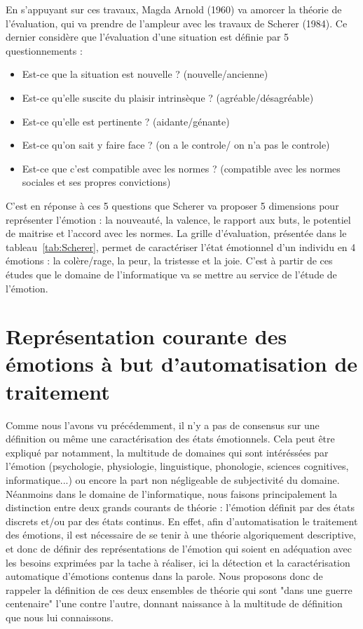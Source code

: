 En s'appuyant sur ces travaux, Magda Arnold (1960) va amorcer la théorie de l'évaluation, qui va prendre de l'ampleur avec les travaux de Scherer (1984). Ce dernier considère que l'évaluation d'une situation est définie par 5 questionnements :
\begin{itemize}
  \item Est-ce que la situation est nouvelle ? (nouvelle/ancienne)
  \item Est-ce qu'elle suscite du plaisir intrinsèque ? (agréable/désagréable)
  \item Est-ce qu'elle est pertinente ? (aidante/génante)
  \item Est-ce qu'on sait y faire face ? (on a le controle/ on n'a pas le controle)
  \item Est-ce que c'est compatible avec les normes ? (compatible avec les normes sociales et ses propres convictions)
\end{itemize}
C'est en réponse à ces 5 questions que Scherer va proposer 5 dimensions pour représenter l'émotion : la nouveauté, la valence, le rapport aux buts, le potentiel de maitrise et l'accord avec les normes. La grille d'évaluation, présentée dans le tableau~\ref{tab:Scherer}, permet de caractériser l'état émotionnel d'un individu en 4 émotions : la colère/rage, la peur, la tristesse et la joie. C'est à partir de ces études que le domaine de l'informatique va se mettre au service de l'étude de l'émotion.



\section{Représentation courante des émotions à but d'automatisation de traitement}
Comme nous l'avons vu précédemment, il n'y a pas de consensus sur une définition ou même une caractérisation des états émotionnels. Cela peut être expliqué par notamment, la multitude de domaines qui sont intéréssées par l'émotion (psychologie, physiologie, linguistique, phonologie, sciences cognitives, informatique...) ou encore la part non négligeable de subjectivité du domaine.
Néanmoins dans le domaine de l'informatique, nous faisons principalement la distinction entre deux grands courants de théorie : l'émotion définit par des états discrets et/ou par des états continus. En effet, afin d'automatisation le traitement des émotions, il est nécessaire de se tenir à une théorie algoriquement descriptive, et donc de définir des représentations de l'émotion qui soient en adéquation avec les besoins exprimées par la tache à réaliser, ici la détection et la caractérisation automatique d'émotions contenus dans la parole. Nous proposons donc de rappeler la définition de ces deux ensembles de théorie qui sont "dans une guerre centenaire" l'une contre l'autre, donnant naissance à la multitude de définition que nous lui connaissons.

